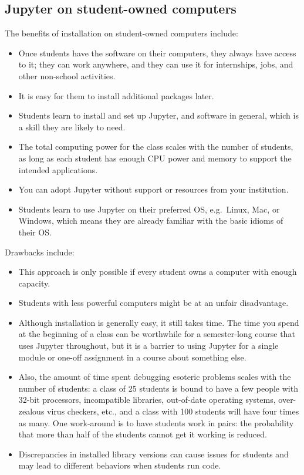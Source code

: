 \documentclass[]{book}
\begin{document}
\subsection{Jupyter on student-owned
computers}\label{jupyter-on-student-owned-computers}

The benefits of installation on student-owned computers include:

\begin{itemize}
\item
  Once students have the software on their computers, they always have
  access to it; they can work anywhere, and they can use it for
  internships, jobs, and other non-school activities.
\item
  It is easy for them to install additional packages later.
\item
  Students learn to install and set up Jupyter, and software in general,
  which is a skill they are likely to need.
\item
  The total computing power for the class scales with the number of
  students, as long as each student has enough CPU power and memory to
  support the intended applications.
\item
  You can adopt Jupyter without support or resources from your
  institution.
\item
  Students learn to use Jupyter on their preferred OS, e.g.~Linux, Mac,
  or Windows, which means they are already familiar with the basic
  idioms of their OS.
\end{itemize}

Drawbacks include:

\begin{itemize}
\item
  This approach is only possible if every student owns a computer with
  enough capacity.
\item
  Students with less powerful computers might be at an unfair
  disadvantage.
\item
  Although installation is generally easy, it still takes time. The time
  you spend at the beginning of a class can be worthwhile for a
  semester-long course that uses Jupyter throughout, but it is a barrier
  to using Jupyter for a single module or one-off assignment in a course
  about something else.
\item
  Also, the amount of time spent debugging esoteric problems scales with
  the number of students: a class of 25 students is bound to have a few
  people with 32-bit processors, incompatible libraries, out-of-date
  operating systems, over-zealous virus checkers, etc., and a class with
  100 students will have four times as many. One work-around is to have
  students work in pairs: the probability that more than half of the
  students cannot get it working is reduced.
\item
  Discrepancies in installed library versions can cause issues for
  students and may lead to different behaviors when students run code.
\end{itemize}
\end{document}
